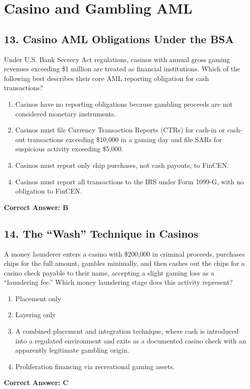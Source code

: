 \documentclass[11pt,a4paper]{article}
\begin{document}
	\section{Casino and Gambling AML}
	
	\subsection{13. Casino AML Obligations Under the BSA}
	Under U.S. Bank Secrecy Act regulations, casinos with annual gross gaming revenues exceeding \$1 million are treated as financial institutions. Which of the following best describes their core AML reporting obligation for cash transactions?
	\begin{enumerate}[label=\Alph*.]
		\item Casinos have no reporting obligations because gambling proceeds are not considered monetary instruments.
		\item Casinos must file Currency Transaction Reports (CTRs) for cash-in or cash-out transactions exceeding \$10,000 in a gaming day and file SARs for suspicious activity exceeding \$5,000.
		\item Casinos must report only chip purchases, not cash payouts, to FinCEN.
		\item Casinos must report all transactions to the IRS under Form 1099-G, with no obligation to FinCEN.
	\end{enumerate}
	\textbf{Correct Answer: B}
	
	\subsection{14. The ``Wash'' Technique in Casinos}
	A money launderer enters a casino with \$200,000 in criminal proceeds, purchases chips for the full amount, gambles minimally, and then cashes out the chips for a casino check payable to their name, accepting a slight gaming loss as a ``laundering fee.'' Which money laundering stage does this activity represent?
	\begin{enumerate}[label=\Alph*.]
		\item Placement only
		\item Layering only
		\item A combined placement and integration technique, where cash is introduced into a regulated environment and exits as a documented casino check with an apparently legitimate gambling origin.
		\item Proliferation financing via recreational gaming assets.
	\end{enumerate}
	\textbf{Correct Answer: C}
	
\end{document}
